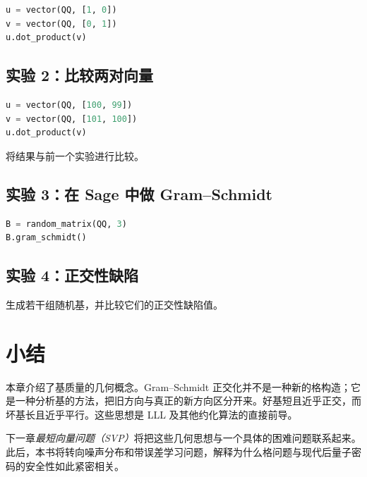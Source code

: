 \begin{lstlisting}[language=Python]
u = vector(QQ, [1, 0])
v = vector(QQ, [0, 1])
u.dot_product(v)
\end{lstlisting}

\subsection{实验 2：比较两对向量}

\begin{lstlisting}[language=Python]
u = vector(QQ, [100, 99])
v = vector(QQ, [101, 100])
u.dot_product(v)
\end{lstlisting}

将结果与前一个实验进行比较。

\subsection{实验 3：在 Sage 中做 Gram--Schmidt}

\begin{lstlisting}[language=Python]
B = random_matrix(QQ, 3)
B.gram_schmidt()
\end{lstlisting}

\subsection{实验 4：正交性缺陷}
生成若干组随机基，并比较它们的正交性缺陷值。

\section{小结}
本章介绍了基质量的几何概念。Gram--Schmidt 正交化并不是一种新的格构造；它是一种分析基的方法，把旧方向与真正的新方向区分开来。好基短且近乎正交，而坏基长且近乎平行。这些思想是 LLL 及其他约化算法的直接前导。

下一章\emph{最短向量问题（SVP）}将把这些几何思想与一个具体的困难问题联系起来。此后，本书将转向噪声分布和带误差学习问题，解释为什么格问题与现代后量子密码的安全性如此紧密相关。

\printbibliography[heading=chapterrefs]
